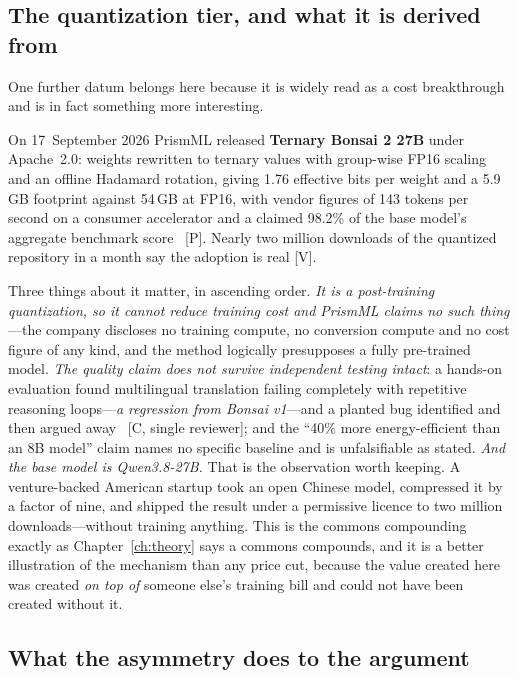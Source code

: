\subsection{The quantization tier, and what it is derived from}

One further datum belongs here because it is widely read as a cost breakthrough and is in fact something more interesting.

On 17~September 2026 PrismML released \textbf{Ternary Bonsai 2 27B} under Apache~2.0: weights rewritten to ternary values with group-wise FP16 scaling and an offline Hadamard rotation, giving 1.76 effective bits per weight and a 5.9\,GB footprint against 54\,GB at FP16, with vendor figures of 143 tokens per second on a consumer accelerator and a claimed 98.2\% of the base model's aggregate benchmark score~\cite{bonsai2} [P]. Nearly two million downloads of the quantized repository in a month say the adoption is real [V].

Three things about it matter, in ascending order. \emph{It is a post-training quantization, so it cannot reduce training cost and PrismML claims no such thing}---the company discloses no training compute, no conversion compute and no cost figure of any kind, and the method logically presupposes a fully pre-trained model. \emph{The quality claim does not survive independent testing intact}: a hands-on evaluation found multilingual translation failing completely with repetitive reasoning loops---\emph{a regression from Bonsai v1}---and a planted bug identified and then argued away~\cite{bonsai2-critique} [C, single reviewer]; and the ``40\% more energy-efficient than an 8B model'' claim names no specific baseline and is unfalsifiable as stated. \emph{And the base model is Qwen3.8-27B.} That is the observation worth keeping. A venture-backed American startup took an open Chinese model, compressed it by a factor of nine, and shipped the result under a permissive licence to two million downloads---without training anything. This is the commons compounding exactly as Chapter~\ref{ch:theory} says a commons compounds, and it is a better illustration of the mechanism than any price cut, because the value created here was created \emph{on top of} someone else's training bill and could not have been created without it.

\subsection{What the asymmetry does to the argument}

